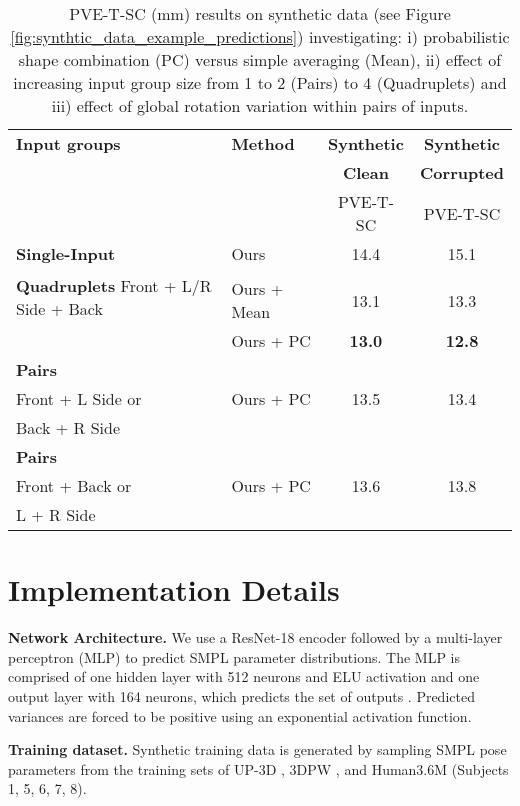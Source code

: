 \documentclass[final]{cvpr}
\begin{document}
\begin{table}[t]
\centering
\small
\renewcommand{\tabcolsep}{1pt}
\begin{tabular}{l l c c} 
 \hline
 \textbf{Input groups} & \textbf{Method} & \textbf{Synthetic} & \textbf{Synthetic}\\
 & & \textbf{Clean} & \textbf{Corrupted}\\
 & & PVE-T-SC & PVE-T-SC\\ [0.5ex] 
 \hline
 \textbf{Single-Input} & Ours & 14.4 & 15.1\\
 \hline
 \multirow{2}{0.3\linewidth}{\textbf{Quadruplets} Front + L/R Side + Back}\\ 
 & Ours + Mean & 13.1 & 13.3\\
& Ours + PC & \textbf{13.0} & \textbf{12.8}\\
 \hline
 \textbf{Pairs} \\
 Front + L Side or  & Ours + PC & 13.5 & 13.4\\
 Back + R Side & & &\\
 \hline
 \textbf{Pairs} \\
 Front + Back or & Ours + PC & 13.6 & 13.8\\
 L + R Side & & &\\
 \hline
\end{tabular}
\caption{PVE-T-SC (mm) results on synthetic data (see Figure \ref{fig:synthtic_data_example_predictions})  investigating: i) probabilistic shape combination (PC) versus simple averaging (Mean), ii) effect of increasing input group size from 1 to 2 (Pairs) to 4 (Quadruplets) and iii) effect of global rotation variation within pairs of inputs.}
\label{table:synth_ablation_comparison}
\end{table}




\section{Implementation Details}
\noindent \textbf{Network Architecture.} We use a ResNet-18 \cite{He2015} encoder followed by a multi-layer perceptron (MLP) to predict SMPL parameter distributions. The MLP is comprised of one hidden layer with 512 neurons and ELU \cite{clevert2016elu} activation and one output layer with 164 neurons, which predicts the set of outputs . Predicted variances are forced to be positive using an exponential activation function.

\noindent \textbf{Training dataset.} Synthetic training data is generated by sampling SMPL pose parameters from the training sets of UP-3D \cite{Lassner:UP:2017}, 3DPW \cite{vonMarcard2018}, and Human3.6M \cite{h36m_pami} (Subjects 1, 5, 6, 7, 8).
\end{document}
